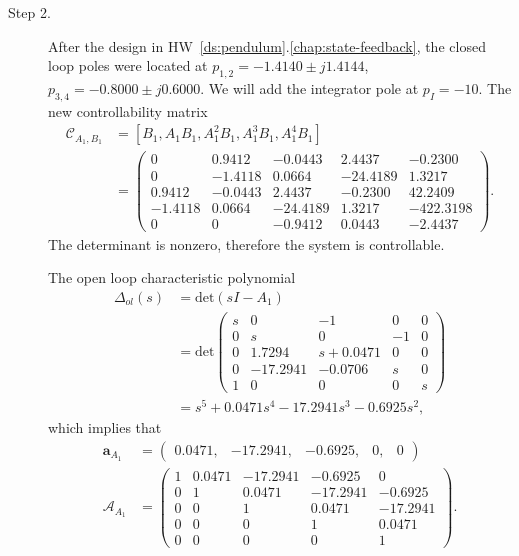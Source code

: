 \begin{description}
\item[Step 2.] 
After the design in HW~\ref{ds:pendulum}.\ref{chap:state-feedback}, the closed loop poles were located at $p_{1,2} = -1.4140 \pm j1.4144$, $p_{3,4}=  -0.8000 \pm j 0.6000$.
We will add the integrator pole at $p_I=-10$.
The new controllability matrix
\begin{align*}
\mathcal{C}_{A_1,B_1} &= [B_1, A_1B_1, A_1^2B_1, A_1^3B_1, A_1^4B_1] \\
&= \begin{pmatrix} 
         0 &   0.9412 &  -0.0443 &   2.4437 &  -0.2300 \\
         0 &  -1.4118 &   0.0664 &  -24.4189 &   1.3217 \\
    0.9412 &  -0.0443 &   2.4437 &  -0.2300 &   42.2409 \\
   -1.4118 &   0.0664 &  -24.4189 &   1.3217 &  -422.3198 \\
         0 &        0 &   -0.9412 &  0.0443 &   -2.4437
         \end{pmatrix}.
\end{align*}
The determinant is nonzero, therefore the system is controllable.  

The open loop characteristic polynomial
\begin{align*}
\Delta_{ol}(s)&=\text{det}(sI-A_1) \\
 &= \text{det} \begin{pmatrix} 
        s &        0 &   -1 &        0  &       0 \\
 		0 &        s &        0 &   -1  &       0 \\ 
 		0 &  1.7294 &  s+0.0471 &        0  &       0 \\
 		0 &  -17.2941 &   -0.0706 &        s  &       0 \\
 		1 &        0 &        0 &        0  &       s
	\end{pmatrix} \\
&= s^5 + 0.0471s^4 -17.2941s^3 - 0.6925s^2,
\end{align*}
which implies that
\begin{align*}
\mathbf{a}_{A_1} &= \begin{pmatrix}0.0471, & -17.2941, &  -0.6925,  &      0,  &       0\end{pmatrix} \\
\mathcal{A}_{A_1} &= \begin{pmatrix} 
1 & 0.0471 & -17.2941 &   -0.6925 & 0 \\ 
0 & 1 & 0.0471 & -17.2941 &   -0.6925 \\ 
0 & 0 & 1 & 0.0471 & -17.2941 \\
0 & 0 & 0 & 1 & 0.0471 \\
0 & 0 & 0 & 0 & 1
\end{pmatrix}.
\end{align*}


\end{description}

